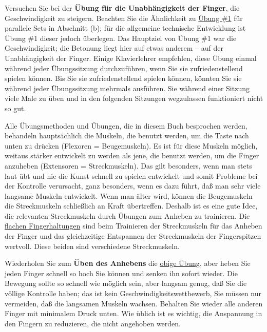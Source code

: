 Versuchen Sie bei der \textbf{Übung für die Unabhängigkeit der Finger}, die Geschwindigkeit zu steigern.
Beachten Sie die Ähnlichkeit zu \hyperref[c1iii7b1]{Übung \#1} für parallele Sets in Abschnitt (b); für die allgemeine technische Entwicklung ist Übung \#1 dieser jedoch überlegen.
Das Hauptziel von Übung \#1 war die Geschwindigkeit; die Betonung liegt hier auf etwas anderem -- auf der Unabhängigkeit der Finger.
Einige Klavierlehrer empfehlen, diese Übung einmal während jeder Übungssitzung durchzuführen, wenn Sie sie zufriedenstellend spielen können.
Bis Sie sie zufriedenstellend spielen können, könnten Sie sie während jeder Übungssitzung mehrmals ausführen.
Sie während einer Sitzung viele Male zu üben und in den folgenden Sitzungen wegzulassen funktioniert nicht so gut.

Alle Übungsmethoden und Übungen, die in diesem Buch besprochen werden, behandeln hauptsächlich die Muskeln, die benutzt werden, um die Taste nach unten zu drücken (Flexoren = Beugemuskeln).
Es ist für diese Muskeln möglich, weitaus stärker entwickelt zu werden als jene, die benutzt werden, um die Finger anzuheben (Extensoren = Streckmuskeln).
Das gilt besonders, wenn man stets laut übt und nie die Kunst schnell zu spielen entwickelt und somit Probleme bei der Kontrolle verursacht, ganz besonders, wenn es dazu führt, daß man sehr viele langsame Muskeln entwickelt.
Wenn man älter wird, können die Beugemuskeln die Streckmuskeln schließlich an Kraft übertreffen.
Deshalb ist es eine gute Idee, die relevanten Streckmuskeln durch Übungen zum Anheben zu trainieren.
Die \hyperref[c1iii4b]{flachen Fingerhaltungen} sind beim Trainieren der Streckmuskeln für das Anheben der Finger und das gleichzeitige Entspannen der Streckmuskeln der Fingerspitzen wertvoll.
Diese beiden sind verschiedene Streckmuskeln.


\label{c1iii7anheben}

Wiederholen Sie zum \textbf{Üben des Anhebens} die \hyperref[c1iii7finger]{obige Übung}, aber heben Sie jeden Finger schnell so hoch Sie können und senken ihn sofort wieder.
Die Bewegung sollte so schnell wie möglich sein, aber langsam genug, daß Sie die völlige Kontrolle haben; das ist kein Geschwindigkeitswettbewerb, Sie müssen nur vermeiden, daß die langsamen Muskeln wachsen.
Behalten Sie wieder alle anderen Finger mit minimalem Druck unten.
Wie üblich ist es wichtig, die Anspannung in den Fingern zu reduzieren, die nicht angehoben werden.

